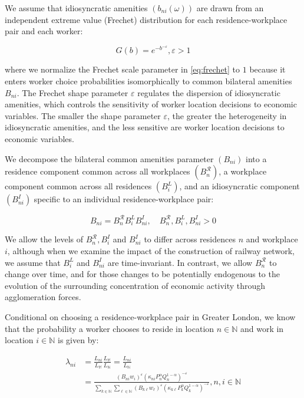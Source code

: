 We assume that idiosyncratic amenities $(b_{ni}(\omega))$ are drawn from an independent extreme value (Frechet) distribution for each residence-workplace pair and each worker:

\begin{equation}
    G(b) = e^{-b^{-\varepsilon}}, \varepsilon > 1 \label{eq:frechet}
\end{equation}

where we normalize the Frechet scale parameter in \eqref{eq:frechet} to $1$ because it enters worker choice probabilities isomorphically to common bilateral amenities $B_{ni}$. The Frechet shape parameter $\varepsilon$ regulates the dispersion of idiosyncratic amenities, which controls the sensitivity of worker location decisions to economic variables. The smaller the shape parameter $\varepsilon$, the greater the heterogeneity in idiosyncratic amenities, and the less sensitive are worker location decisions to economic variables.

We decompose the bilateral common amenities parameter $(B_{ni})$ into a residence component common across all workplaces $(B_n^{\mathcal{R}})$, a workplace component common across all residences $(B_i^L)$, and an idiosyncratic component $(B_{ni}^I)$ specific to an individual residence-workplace pair:

\begin{equation}
    B_{ni} = B_n^{\mathcal{R}}B_i^L B_{ni}^I, \quad B_n^{\mathcal{R}}, B_i^L, B_{ni}^I > 0
\end{equation}

We allow the levels of $B_n^{\mathcal{R}}, B_i^I$ and $B_{ni}^I$ to differ across residences $n$ and workplace $i$, although when we examine the impact of the construction of railway network, we assume that $B_i^L$ and $B_{ni}^I$ are time-invariant. In contrast, we allow $B_n^{\mathcal{R}}$ to change over time, and for those changes to be potentially endogenous to the evolution of the surrounding concentration of economic activity through agglomeration forces.

Conditional on choosing a residence-workplace pair in Greater London, we know that the probability a worker chooses to reside in location $n \in \mathbb{N}$ and work in location $i \in \mathbb{N}$ is given by:

\begin{equation}
    \begin{aligned}
        \lambda_{ni} & = \frac{L_{ni}}{L_{\mathbb{M}}} \frac{L_{\mathbb{M}}}{L_{\mathbb{N}}} = \frac{L_{ni}}{L_{\mathbb{N}}} \\
        & = \frac{(B_{ni} w_i)^{\varepsilon} (\kappa_{ni} P_n^{\alpha} Q_n^{1 - \alpha})^{-\varepsilon}}{\sum_{k \in \mathbb{N}} \sum_{\ell \in \mathbb{N}} (B_{k\ell}w_{\ell})^{\varepsilon} (\kappa_{k\ell} P_{k}^{\alpha} Q_k^{1 - \alpha})^{-\varepsilon} }, n,  i \in \mathbb{N}
    \end{aligned}
\end{equation}

